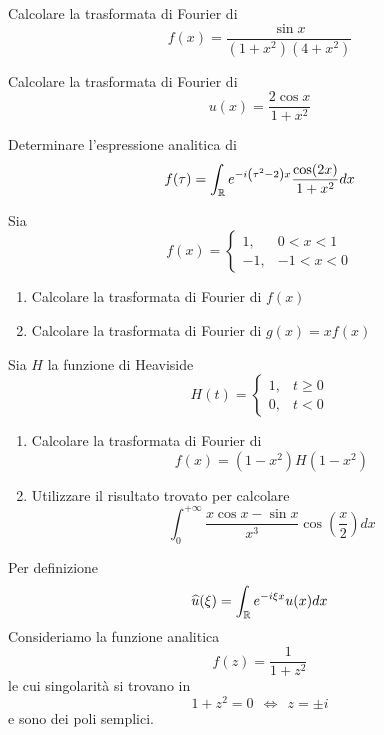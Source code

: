 Calcolare la trasformata di Fourier di
\begin{equation*}
f(x) = \frac{\sin x}{\left(1 + x^{2}\right)\left(4 + x^{2}\right)}
\end{equation*}
\Esercizio{}

Calcolare la trasformata di Fourier di
\begin{equation*}
u(x) = \frac{2\cos x}{1 + x^{2}}
\end{equation*}
\Esercizio{}

Determinare l'espressione analitica di
\begin{equation*}
f(\tau) = \int_{\mathbb{R}} e^{- i\left(\tau^{2} - 2\right) x}\frac{\cos(2x)}{1 + x^{2}} dx
\end{equation*}
\Esercizio{}

Sia
\begin{equation*}
f(x) = 
\begin{cases}
1, & 0 < x < 1\\
- 1, & - 1 < x < 0
\end{cases}
\end{equation*}
\begin{enumerate}
\item Calcolare la trasformata di Fourier di $f(x)$
\item Calcolare la trasformata di Fourier di $g(x) = xf(x)$
\end{enumerate}
\Esercizio{}

Sia $H$ la funzione di Heaviside
\begin{equation*}
H(t) = 
\begin{cases}
1, & t \geq 0\\
0, & t < 0
\end{cases}
\end{equation*}
\begin{enumerate}
\item Calcolare la trasformata di Fourier di
\begin{equation*}
f(x) = \left(1 - x^{2}\right) H\left(1 - x^{2}\right)
\end{equation*}
\item Utilizzare il risultato trovato per calcolare
\begin{equation*}
\int^{+ \infty}_{0}\frac{x\cos x - \sin x}{x^{3}}\cos\left(\frac{x}{2}\right) dx
\end{equation*}
\end{enumerate}
\ParteSoluzioni
\Soluzione

Per definizione
\begin{equation*}
\widehat{u}(\xi) = \int_{\mathbb{R}} e^{- i\xi x} u(x) dx
\end{equation*}
Consideriamo la funzione analitica
\begin{equation*}
f(z) = \frac{1}{1 + z^{2}}
\end{equation*}
le cui singolarità si trovano in
\begin{equation*}
1 + z^{2} = 0\ \ \iff \ \ z = \pm i
\end{equation*}
e sono dei poli semplici.


